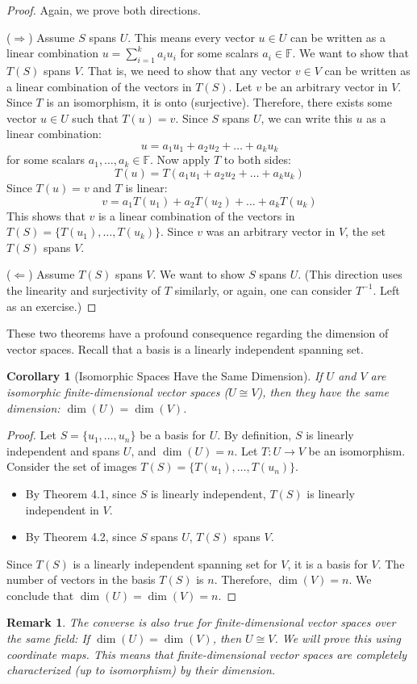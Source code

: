 \documentclass[11pt, letterpaper]{article}
\theoremstyle{mytheoremstyle}
\newtheorem{corollary}[theorem]{Corollary}
\theoremstyle{mydefinitionstyle}
\theoremstyle{myremarkstyle}
\newtheorem{remark}[theorem]{Remark}
\newcommand{\F}{\mathbb{F}}
\DeclareMathOperator{\dimv}{dim} %
\begin{document}
\begin{proof} Again, we prove both directions.

($\Rightarrow$) Assume $S$ spans $U$. This means every vector $u \in U$ can be written as a linear combination $u = \sum_{i=1}^k a_i u_i$ for some scalars $a_i \in \F$. We want to show that $T(S)$ spans $V$. That is, we need to show that any vector $v \in V$ can be written as a linear combination of the vectors in $T(S)$.
Let $v$ be an arbitrary vector in $V$. Since $T$ is an isomorphism, it is onto (surjective). Therefore, there exists some vector $u \in U$ such that $T(u) = v$.
Since $S$ spans $U$, we can write this $u$ as a linear combination:
\[ u = a_1 u_1 + a_2 u_2 + \dots + a_k u_k \]
for some scalars $a_1, \dots, a_k \in \F$. Now apply $T$ to both sides:
\[ T(u) = T(a_1 u_1 + a_2 u_2 + \dots + a_k u_k) \]
Since $T(u) = v$ and $T$ is linear:
\[ v = a_1 T(u_1) + a_2 T(u_2) + \dots + a_k T(u_k) \]
This shows that $v$ is a linear combination of the vectors in $T(S) = \{T(u_1), \dots, T(u_k)\}$. Since $v$ was an arbitrary vector in $V$, the set $T(S)$ spans $V$.

($\Leftarrow$) Assume $T(S)$ spans $V$. We want to show $S$ spans $U$. (This direction uses the linearity and surjectivity of $T$ similarly, or again, one can consider $T^{-1}$. Left as an exercise.)
\end{proof}

These two theorems have a profound consequence regarding the dimension of vector spaces. Recall that a basis is a linearly independent spanning set.

\begin{corollary}[Isomorphic Spaces Have the Same Dimension]
If $U$ and $V$ are isomorphic finite-dimensional vector spaces ($U \cong V$), then they have the same dimension: $\dimv(U) = \dimv(V)$.
\end{corollary}
\begin{proof}
Let $S = \{u_1, \dots, u_n\}$ be a basis for $U$. By definition, $S$ is linearly independent and spans $U$, and $\dimv(U) = n$.
Let $T: U \to V$ be an isomorphism. Consider the set of images $T(S) = \{T(u_1), \dots, T(u_n)\}$.
\begin{itemize}
    \item By Theorem 4.1, since $S$ is linearly independent, $T(S)$ is linearly independent in $V$.
    \item By Theorem 4.2, since $S$ spans $U$, $T(S)$ spans $V$.
\end{itemize}
Since $T(S)$ is a linearly independent spanning set for $V$, it is a basis for $V$. The number of vectors in the basis $T(S)$ is $n$. Therefore, $\dimv(V) = n$.
We conclude that $\dimv(U) = \dimv(V) = n$.
\end{proof}
\begin{remark}
The converse is also true for finite-dimensional vector spaces over the same field: If $\dimv(U) = \dimv(V)$, then $U \cong V$. We will prove this using coordinate maps. This means that finite-dimensional vector spaces are completely characterized (up to isomorphism) by their dimension.
\end{remark}
\end{document}
